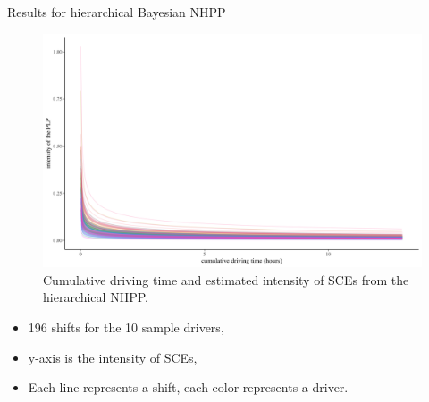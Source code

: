 \begin{frame}{Results for hierarchical Bayesian NHPP}
\begin{figure}
  \includegraphics[height=0.45\textheight]{Figures/fit_plp.png}
  \caption{Cumulative driving time and estimated intensity of SCEs from the hierarchical NHPP.}
\end{figure}
\begin{itemize}
    \item 196 shifts for the 10 sample drivers,
    \item y-axis is the intensity of SCEs,
    \item Each line represents a shift, each color represents a driver.
\end{itemize}
\end{frame}